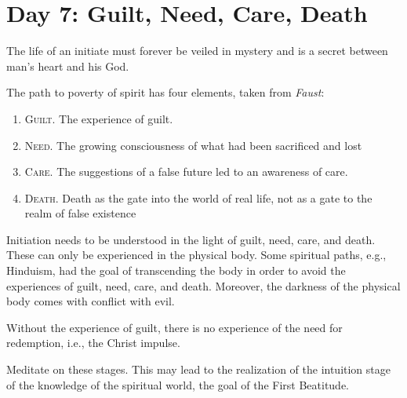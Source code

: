 \section{Day 7: Guilt, Need, Care, Death}

\begin{quotex}
The life of an initiate must forever be veiled in mystery and is a secret between man's heart and
his God. 


\end{quotex}
The path to poverty of spirit has four elements, taken from \emph{Faust}:

\begin{enumerate}
\item \textsc{Guilt}. The experience of guilt. 
\item \textsc{Need}. The growing consciousness of what had been sacrificed and lost 
\item \textsc{Care}. The suggestions of a false future led to an awareness of care. 
\item \textsc{Death}. Death as the gate into the world of real life, not as a gate to the realm of false existence 
\end{enumerate}

Initiation needs to be understood in the light of guilt, need, care, and death. These can only be experienced in the physical body. Some spiritual paths, e.g., Hinduism, had the goal of transcending the body in order to avoid the experiences of guilt, need, care, and death. Moreover, the darkness of the physical body comes with conflict with evil.

Without the experience of guilt, there is no experience of the need for redemption, i.e., the Christ impulse.

Meditate on these stages. This may lead to the realization of the intuition stage of the knowledge of the spiritual world, the goal of the First Beatitude.

